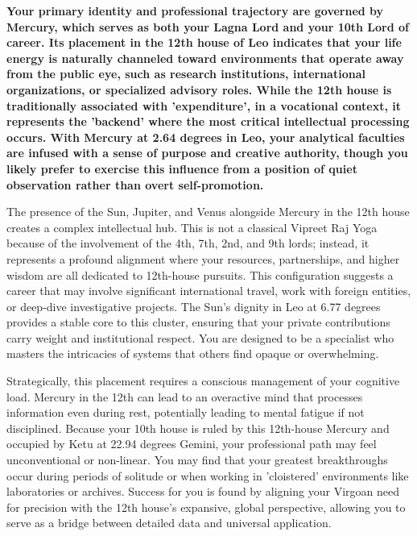 
\label{topic8}

{\fontsize{9.5}{13.8}\selectfont\bfseries\color{DeepSlate} Your primary identity and professional trajectory are governed by Mercury, which serves as both your Lagna Lord and your 10th Lord of career. Its placement in the 12th house of Leo indicates that your life energy is naturally channeled toward environments that operate away from the public eye, such as research institutions, international organizations, or specialized advisory roles. While the 12th house is traditionally associated with 'expenditure', in a vocational context, it represents the 'backend' where the most critical intellectual processing occurs. With Mercury at 2.64 degrees in Leo, your analytical faculties are infused with a sense of purpose and creative authority, though you likely prefer to exercise this influence from a position of quiet observation rather than overt self-promotion.}\par\vspace{2mm}

{\fontsize{9}{13}\selectfont The presence of the Sun, Jupiter, and Venus alongside Mercury in the 12th house creates a complex intellectual hub. This is not a classical Vipreet Raj Yoga because of the involvement of the 4th, 7th, 2nd, and 9th lords; instead, it represents a profound alignment where your resources, partnerships, and higher wisdom are all dedicated to 12th-house pursuits. This configuration suggests a career that may involve significant international travel, work with foreign entities, or deep-dive investigative projects. The Sun's dignity in Leo at 6.77 degrees provides a stable core to this cluster, ensuring that your private contributions carry weight and institutional respect. You are designed to be a specialist who masters the intricacies of systems that others find opaque or overwhelming.}\par\vspace{1.8mm}

{\fontsize{9}{13}\selectfont Strategically, this placement requires a conscious management of your cognitive load. Mercury in the 12th can lead to an overactive mind that processes information even during rest, potentially leading to mental fatigue if not disciplined. Because your 10th house is ruled by this 12th-house Mercury and occupied by Ketu at 22.94 degrees Gemini, your professional path may feel unconventional or non-linear. You may find that your greatest breakthroughs occur during periods of solitude or when working in 'cloistered' environments like laboratories or archives. Success for you is found by aligning your Virgoan need for precision with the 12th house's expansive, global perspective, allowing you to serve as a bridge between detailed data and universal application.}\par\vspace{1.8mm}


